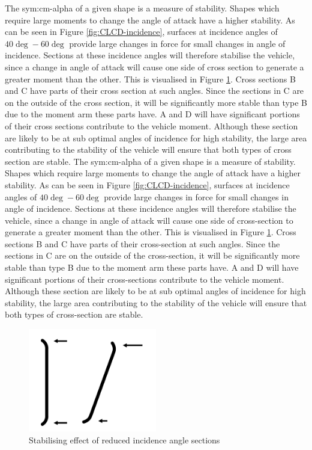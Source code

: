 The \gls{sym:cm-alpha} of a given shape is a measure of stability. Shapes which require large moments to change the angle of attack have a higher stability. As can be seen in Figure \ref{fig:CLCD-incidence}, surfaces at incidence angles of $40\deg-60\deg$ provide large changes in force for small changes in angle of incidence. Sections at these incidence angles will therefore stabilise the vehicle, since a change in angle of attack will cause one side of cross section to generate a greater moment than the other. This is visualised in Figure \ref{fig:StabMom}. Cross sections B and C have parts of their cross section at such angles. Since the sections in C are on the outside of the cross section, it will be significantly more stable than type B due to the moment arm these parts have. A and D will have significant portions of their cross sections contribute to the vehicle moment. Although these section are likely to be at sub optimal angles of incidence for high stability, the large area contributing to the stability of the vehicle will ensure that both types of cross section are stable. 
The \gls{sym:cm-alpha} of a given shape is a measure of stability. Shapes which require large moments to change the angle of attack have a higher stability. As can be seen in Figure \ref{fig:CLCD-incidence}, surfaces at incidence angles of $40\deg-60\deg$ provide large changes in force for small changes in angle of incidence. Sections at these incidence angles will therefore stabilise the vehicle, since a change in angle of attack will cause one side of cross-section to generate a greater moment than the other. This is visualised in Figure \ref{fig:StabMom}. Cross sections B and C have parts of their cross-section at such angles. Since the sections in C are on the outside of the cross-section, it will be significantly more stable than type B due to the moment arm these parts have. A and D will have significant portions of their cross-sections contribute to the vehicle moment. Although these section are likely to be at sub optimal angles of incidence for high stability, the large area contributing to the stability of the vehicle will ensure that both types of cross-section are stable. 

\begin{figure}[h]
	\centering
	\includegraphics[width=0.5\textwidth]{./Figure/Aerodynamics/StabilizeMoment.pdf}
	\caption{Stabilising effect of reduced incidence angle sections}
	\label{fig:StabMom}
\end{figure}

